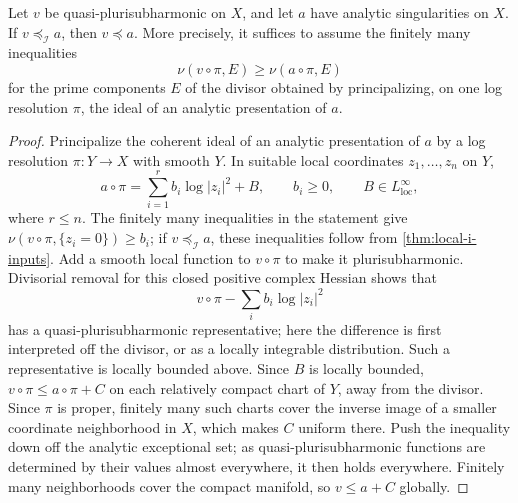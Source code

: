 \begin{lemma}\label{lem:analytic-ideal-dominance}
Let $v$ be quasi-plurisubharmonic on $X$, and let $a$ have analytic singularities on $X$. If $v\preceq_{\mathcal I}a$, then $v\preceq a$. More precisely, it suffices to assume the finitely many inequalities
\[
 \nu(v\circ\pi,E)\geq\nu(a\circ\pi,E)
\]
for the prime components $E$ of the divisor obtained by principalizing, on one log resolution $\pi$, the ideal of an analytic presentation of $a$.
\end{lemma}
\begin{proof}
Principalize the coherent ideal of an analytic presentation of $a$ by a log resolution $\pi\colon Y\to X$ with smooth $Y$. In suitable local coordinates $z_1,\ldots,z_n$ on $Y$,
\[
 a\circ\pi=\sum_{i=1}^r b_i\log|z_i|^2+B,
 \qquad b_i\geq0,\qquad B\in L^\infty_{\mathrm{loc}},
\]
where $r\leq n$. The finitely many inequalities in the statement give $\nu(v\circ\pi,\{z_i=0\})\geq b_i$; if $v\preceq_{\mathcal I}a$, these inequalities follow from \cref{thm:local-i-inputs}. Add a smooth local function to $v\circ\pi$ to make it plurisubharmonic. Divisorial removal for this closed positive complex Hessian shows that
\[
 v\circ\pi-\sum_i b_i\log|z_i|^2
\]
has a quasi-plurisubharmonic representative; here the difference is first interpreted off the divisor, or as a locally integrable distribution. Such a representative is locally bounded above. Since $B$ is locally bounded, $v\circ\pi\leq a\circ\pi+C$ on each relatively compact chart of $Y$, away from the divisor. Since $\pi$ is proper, finitely many such charts cover the inverse image of a smaller coordinate neighborhood in $X$, which makes $C$ uniform there. Push the inequality down off the analytic exceptional set; as quasi-plurisubharmonic functions are determined by their values almost everywhere, it then holds everywhere. Finitely many neighborhoods cover the compact manifold, so $v\leq a+C$ globally.
\end{proof}


